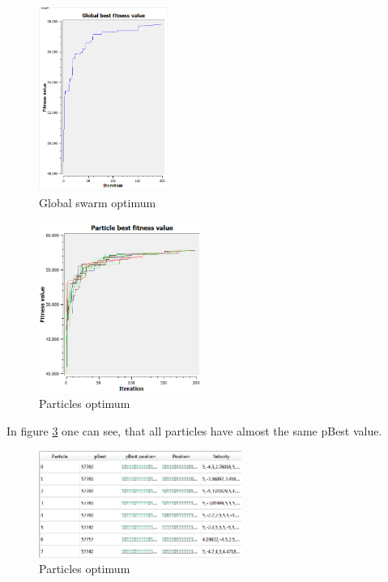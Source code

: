 \documentclass{article}
\begin{document}
\begin{figure}[H]
    \centering
    \includegraphics[width=160px]{images/p30_200it_p1.PNG}
    \caption{Global swarm optimum}
    \label{fig-p30_200it_p1}
\end{figure}

\begin{figure}[H]
    \centering
    \includegraphics[width=200px]{images/p30_200it_p1_particles.PNG}
    \caption{Particles optimum}
    \label{fig-p30_200it_p1_particles}
\end{figure}

In figure \ref{fig-particles_optimum} one can see, that all particles have almost the same pBest value.

\begin{figure}[H]
    \centering
    \includegraphics[width=250px]{images/particles_optimum.PNG}
    \caption{Particles optimum}
    \label{fig-particles_optimum}
\end{figure}
\end{document}
